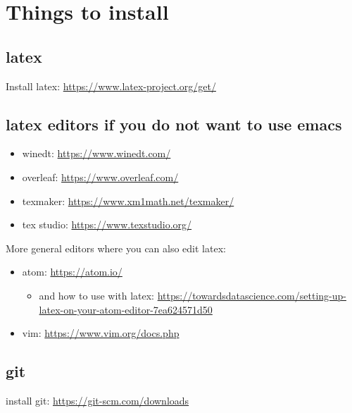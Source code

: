\documentclass[11pt]{article}
\begin{document}





\newpage
\appendix


\section{Things to install}
\label{sec:orga7cc6ce}
\label{sec:install}

\subsection{latex}
\label{sec:orgd7cc053}

Install latex: \url{https://www.latex-project.org/get/}



\subsection{latex editors if you do not want to use emacs}
\label{sec:org242f65e}

\begin{itemize}
\item winedt: \url{https://www.winedt.com/}
\item overleaf: \url{https://www.overleaf.com/}
\item texmaker: \url{https://www.xm1math.net/texmaker/}
\item tex studio: \url{https://www.texstudio.org/}
\end{itemize}

More general editors where you can also edit latex:

\begin{itemize}
\item atom: \url{https://atom.io/}
\begin{itemize}
\item and how to use with latex: \url{https://towardsdatascience.com/setting-up-latex-on-your-atom-editor-7ea624571d50}
\end{itemize}
\item vim: \url{https://www.vim.org/docs.php}
\end{itemize}


\subsection{git}
\label{sec:orgb864045}

install git: \url{https://git-scm.com/downloads}
\end{document}
